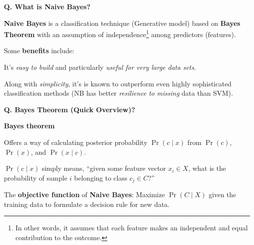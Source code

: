 \begin{frame}[fragile]{\textbf{Q. What is Naive Bayes?}}
  \begin{wideitemize}
  \item \textbf{Naive Bayes} is a classification technique (Generative model) based
    on \textbf{Bayes Theorem} with an assumption of independence\footnote{In
      other words, it assumes that each feature makes an independent and
      equal contribution to the outcome.} among predictors (features).
  \item Some \textbf{benefits} include:\medskip
  \begin{wideitemize}
    \item It's \textit{easy to build} and particularly \textit{useful for very large data sets}.
    \item Along with \textit{simplicity}, it's is known to outperform even highly
      sophisticated classification methods (NB has better \textit{resilience to missing} data than SVM).
  \end{wideitemize}
  \end{wideitemize}
\end{frame}

\begin{frame}[fragile]{\textbf{Q. Bayes Theorem (Quick Overview)?}}
  \begin{wideitemize}\small
  \item \textbf{Bayes theorem} \medskip
    \begin{wideitemize}\small
      \item Offers a way of calculating posterior probability $\Pr( c \mid x )$ from
      $\Pr( c )$, $\Pr( x )$, and $\Pr( x \mid c )$.
      \item $\Pr( c \mid x )$ simply means, ``given some feature vector $x_i \in X$, what is the
      probability of sample $i$ belonging to class $c_j \in C$?''
  \end{wideitemize}
  \end{wideitemize}

  \begin{framed}
    The \textbf{objective function} of \textbf{Naive Bayes}: Maximize $\Pr( C
    \mid X )$ given the training data to formulate a decision rule for new data.
  \end{framed}

\end{frame}


